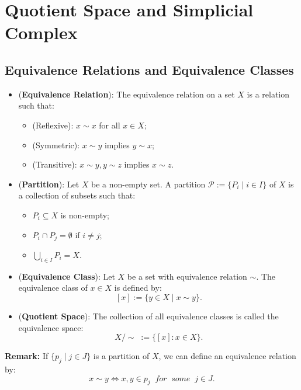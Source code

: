 \chapter{Quotient Space and Simplicial Complex}

\section{Equivalence Relations and Equivalence Classes}

\begin{definition}
    \begin{itemize}
        \item (\textbf{Equivalence Relation}): The equivalence relation on a set  $X$ is a relation such that:
        \begin{itemize}
            \item (Reflexive): $x \sim x$ for all $x \in X$;
            \item (Symmetric): $x \sim y$ implies $y \sim x$;
            \item (Transitive): $x \sim y,y\sim z$ implies $x\sim z$.
        \end{itemize}
        \item (\textbf{Partition}): Let $X$ be a non-empty set. A partition $\mathcal{P} := \{ P_i \mid i \in I \}$ of $X$ is a collection of subsets such that:
        \begin{itemize}
            \item $P_i \subseteq X$ is non-empty;
            \item $P_i \cap P_j = \emptyset$ if $i\neq j$;
            \item $\bigcup_{i \in I} P_i = X$.
        \end{itemize}
        \item (\textbf{Equivalence Class}): Let $X$ be a set with equivalence relation $\sim$. The equivalence class of $x\in X$ is defined by:
        $$[x] := \{ y\in X \mid x \sim y \}.$$
        \item (\textbf{Quotient Space}): The collection of all equivalence classes is called the equivalence space: 
        $$X / \sim  \; := \{ [x] : x\in X \}.$$
    \end{itemize}
\end{definition}

\noindent\textbf{Remark:} If $\{ p_j \mid j \in J \}$ is a partition of $X$, we can define an equivalence relation by:
$$x \sim y \Leftrightarrow x,y \in p_j \;\; for \;\; some \;\; j\in J.$$

